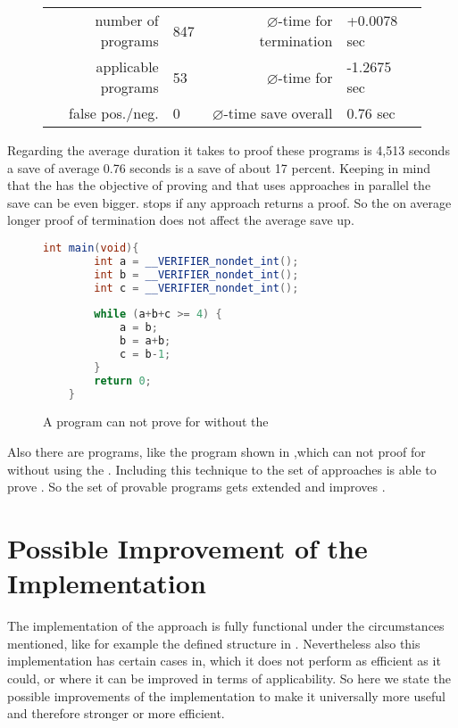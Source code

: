\begin{figure}[H]
	\centering
	\begin{tabular}{rlrl}
		number of programs 	& 847 & $\varnothing$-time for termination & +0.0078 sec \\
		applicable programs & 53 & $\varnothing$-time for \nonterm & -1.2675 sec \\
		false pos./neg. & 0 & $\varnothing$-time save overall & 0.76 sec \\
	\end{tabular}	
\end{figure}

Regarding the average duration it takes \aprove to proof these programs is 4,513 seconds a save of average 0.76 seconds is a save of about 17 percent. Keeping in mind that the \gnanal has the objective of proving \nonterm and that \aprove uses approaches in parallel the save can be even bigger. \aprove stops if any approach returns a proof. So the on average longer proof of termination does not affect the average save up. \newline
\begin{figure}[H]
	\begin{lstlisting}[language = java]
	int main(void){
		int a = __VERIFIER_nondet_int();
		int b = __VERIFIER_nondet_int();
		int c = __VERIFIER_nondet_int();
		
		while (a+b+c >= 4) {
			a = b;
			b = a+b;
			c = b-1;
		}
		return 0;
	}
	\end{lstlisting}
	\caption{A program \aprove can not prove \nonterm for without the \gnanal}
	\label{fig:program-newproof}
\end{figure}
Also there are programs, like the program shown in ,which \aprove can not proof \nonterm for without using the \gnanal. Including this technique to the set of approaches \aprove is able to prove \nonterm. So the set of provable programs gets extended and improves \aprove.


\section{Possible Improvement of the Implementation}
The implementation of the approach is fully functional under the circumstances mentioned, like for example the defined structure in . Nevertheless also this implementation has certain cases in, which it does not perform as efficient as it could, or where it can be improved in terms of applicability.
So here we state the possible improvements of the implementation to make it universally more useful and therefore stronger or more efficient.

